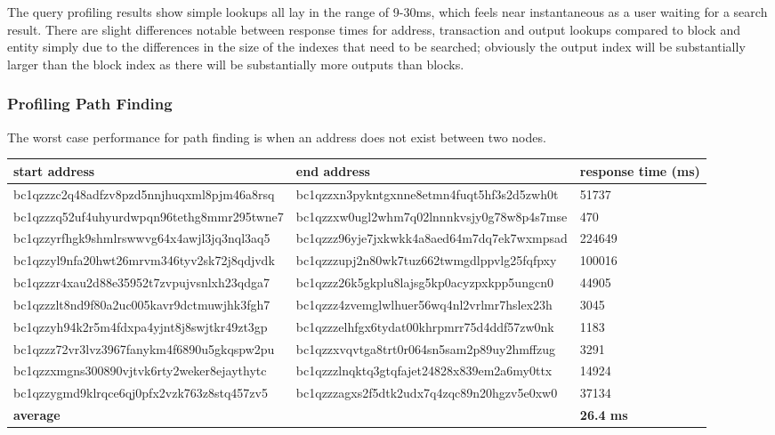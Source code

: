 \\\\
The query profiling results show simple lookups all lay in the range of 9-30ms, which feels near instantaneous as a user waiting for a search result. There are slight differences notable between response times for address, transaction and output lookups compared to block and entity simply due to the differences in the size of the indexes that need to be searched; obviously the output index will be substantially larger than the block index as there will be substantially more outputs than blocks. 

\subsubsection{Profiling Path Finding}
The worst case performance for path finding is when an address does not exist between two nodes. 

\begin{center}
\begin{tabular}{ |p{5.5cm}|p{5.5cm}| p{3cm} |} 
 \hline
\textbf{start address} & \textbf{end address} & \textbf{response} \textbf{time (ms)} \\\hline
bc1qzzzc2q48adfzv8p\-zd5nnjhuqxml8pjm46a8rsq & bc1qzzxn3pykntgxnne\-8etmn4fuqt5hf3s2d5zwh0t & 51737 \\\hline
bc1qzzzq52uf4uhyurd\-wpqn96tethg8mmr295twne7 & bc1qzzxw0ugl2whm7q0\-2lnnnkvsjy0g78w8p4s7mse & 470 \\\hline
bc1qzzyrfhgk9shmlrs\-wwvg64x4awjl3jq3nql3aq5 & bc1qzzz96yje7jxkwkk\-4a8aed64m7dq7ek7wxmpsad & 224649 \\\hline
bc1qzzyl9nfa20hwt26\-mrvm346tyv2sk72j8qdjvdk & bc1qzzzupj2n80wk7tu\-z662twmgdlppvlg25fqfpxy & 100016 \\\hline
bc1qzzzr4xau2d88e35\-952t7zvpujvsnlxh23qdga7 & bc1qzzz26k5gkplu8la\-jsg5kp0acyzpxkpp5ungcn0 & 44905 \\\hline
bc1qzzzlt8nd9f80a2u\-c005kavr9dctmuwjhk3fgh7 & bc1qzzz4zvemglwlhue\-r56wq4nl2vrlmr7hslex23h & 3045 \\\hline
bc1qzzyh94k2r5m4fdx\-pa4yjnt8j8swjtkr49zt3gp & bc1qzzzelhfgx6tydat\-00khrpmrr75d4ddf57zw0nk & 1183 \\\hline
bc1qzzz72vr3lvz3967\-fanykm4f6890u5gkqspw2pu & bc1qzzxvqvtga8trt0r\-064sn5sam2p89uy2hmffzug & 3291 \\\hline
bc1qzzxmgns300890vj\-tvk6rty2weker8ejaythytc & bc1qzzzlnqktq3gtqfa\-jet24828x839em2a6my0ttx & 14924 \\\hline
bc1qzzygmd9klrqce6q\-j0pfx2vzk763z8stq457zv5 & bc1qzzzagxs2f5dtk2u\-dx7q4zqc89n20hgzv5e0xw0 & 37134 \\
\hline \textbf{average} & & \textbf{26.4 ms} \\\hline
\end{tabular}
\end{center}

